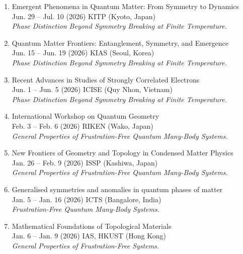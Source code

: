 \documentclass[letterpaper,11pt]{article}
\begin{document}
\begin{enumerate}
\section*{Invited Talks in International Workshops / Conferences}

\item Emergent Phenomena in Quantum Matter: From Symmetry to Dynamics\\
Jun. 29 -- Jul. 10 (2026) KITP (Kyoto, Japan)\\
\emph{Phase Distinction Beyond Symmetry Breaking at Finite Temperature.}

\item Quantum Matter Frontiers: Entanglement, Symmetry, and Emergence\\
Jun. 15 -- Jun. 19 (2026) KIAS (Seoul, Korea)\\
\emph{Phase Distinction Beyond Symmetry Breaking at Finite Temperature.}

\item Recent Advances in Studies of Strongly Correlated Electrons\\
Jun. 1 -- Jun. 5 (2026) ICISE (Quy Nhon, Vietnam)\\
\emph{Phase Distinction Beyond Symmetry Breaking at Finite Temperature.}

\item International Workshop on Quantum Geometry\\
Feb. 3 -- Feb. 6  (2026) RIKEN (Wako, Japan)\\
\emph{General Properties of Frustration-Free Quantum Many-Body Systems.}

\item New Frontiers of Geometry and Topology in Condensed Matter Physics\\
Jan. 26 -- Feb. 9  (2026) ISSP (Kashiwa, Japan)\\
\emph{General Properties of Frustration-Free Quantum  Many-Body Systems.}

\item Generalised symmetries and anomalies in quantum phases of matter\\
Jan. 5 -- Jan. 16  (2026) ICTS (Bangalore, India)\\
\emph{Frustration-Free Quantum Many-Body Systems.}

\item Mathematical Foundations of Topological Materials\\
Jan. 6 -- Jan. 9  (2026) IAS, HKUST (Hong Kong)\\
\emph{General Properties of Frustration-Free Systems.}


\end{enumerate}
\end{document}
